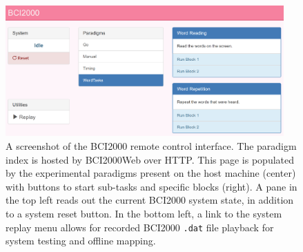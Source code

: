\documentclass[utf8]{frontiersSCNS}
\begin{document}
\begin{figure}[h!]
\begin{center}
\includegraphics[width=0.95\textwidth]{figures/f2_remote_control}%
\end{center}
\caption{A screenshot of the BCI2000 remote control interface. The paradigm index is hosted by BCI2000Web over HTTP. This page is populated by the experimental paradigms present on the host machine (center) with buttons to start sub-tasks and specific blocks (right). A pane in the top left reads out the current BCI2000 system state, in addition to a system reset button. In the bottom left, a link to the system replay menu allows for recorded BCI2000 \texttt{.dat} file playback for system testing and offline mapping.}\label{fig:remote_control}
\end{figure}
\end{document}
